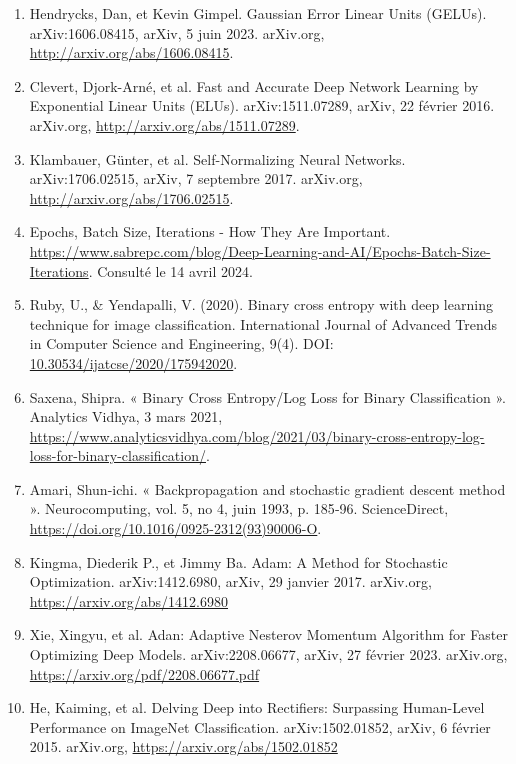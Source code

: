 \documentclass [12pt] {article}
\numberwithin{equation}{section} %
\numberwithin{figure}{section}   %
\begin{document}
\begin{enumerate}
    \item Hendrycks, Dan, et Kevin Gimpel. Gaussian Error Linear Units (GELUs). arXiv:1606.08415, arXiv, 5 juin 2023. arXiv.org, \url{http://arxiv.org/abs/1606.08415}. \label{GELU}
    \item Clevert, Djork-Arné, et al. Fast and Accurate Deep Network Learning by Exponential Linear Units (ELUs). arXiv:1511.07289, arXiv, 22 février 2016. arXiv.org, \url{http://arxiv.org/abs/1511.07289}. \label{ELU}
    \item Klambauer, Günter, et al. Self-Normalizing Neural Networks. arXiv:1706.02515, arXiv, 7 septembre 2017. arXiv.org, \url{http://arxiv.org/abs/1706.02515}. \label{SELU}
    \item Epochs, Batch Size, Iterations - How They Are Important. \url{https://www.sabrepc.com/blog/Deep-Learning-and-AI/Epochs-Batch-Size-Iterations}. Consulté le 14 avril 2024.
    \item Ruby, U., & Yendapalli, V. (2020). Binary cross entropy with deep learning technique for image classification. International Journal of Advanced Trends in Computer Science and Engineering, 9(4). DOI: \url{10.30534/ijatcse/2020/175942020}. \label{binary cross entropy}
    \item Saxena, Shipra. « Binary Cross Entropy/Log Loss for Binary Classification ». Analytics Vidhya, 3 mars 2021,\\
    \url{https://www.analyticsvidhya.com/blog/2021/03/binary-cross-entropy-log-loss-for-binary-classification/}.
    \item Amari, Shun-ichi. « Backpropagation and stochastic gradient descent method ». Neurocomputing, vol. 5, no 4, juin 1993, p. 185‑96. ScienceDirect, \url{https://doi.org/10.1016/0925-2312(93)90006-O}. \label{SGD v9}
    \item Kingma, Diederik P., et Jimmy Ba. Adam: A Method for Stochastic Optimization. arXiv:1412.6980, arXiv, 29 janvier 2017. arXiv.org, \url{https://arxiv.org/abs/1412.6980} \label{Adam}
    \item Xie, Xingyu, et al. Adan: Adaptive Nesterov Momentum Algorithm for Faster Optimizing Deep Models. arXiv:2208.06677, arXiv, 27 février 2023. arXiv.org, \url{https://arxiv.org/pdf/2208.06677.pdf} \label{Nesterov}
    \item He, Kaiming, et al. Delving Deep into Rectifiers: Surpassing Human-Level Performance on ImageNet Classification. arXiv:1502.01852, arXiv, 6 février 2015. arXiv.org, \url{https://arxiv.org/abs/1502.01852} \label{He init}

\end{enumerate}
\end{document}
